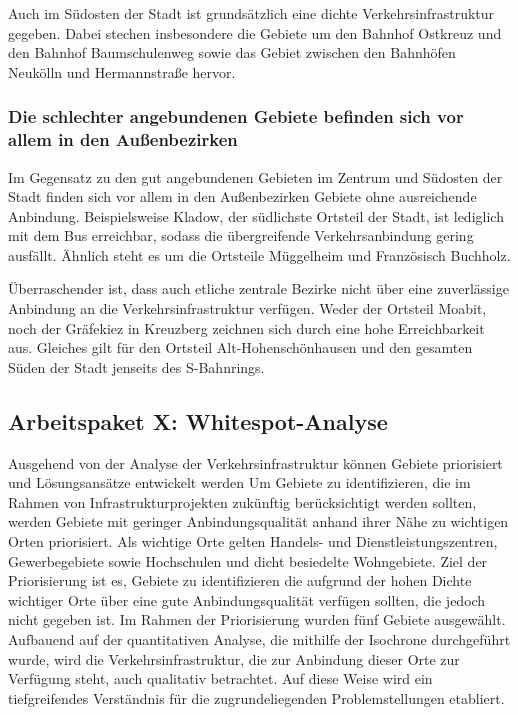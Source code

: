 Auch im Südosten der Stadt ist grundsätzlich eine dichte Verkehrsinfrastruktur gegeben. Dabei stechen insbesondere die Gebiete um den Bahnhof Ostkreuz und den Bahnhof Baumschulenweg sowie das Gebiet zwischen den Bahnhöfen Neukölln und Hermannstraße hervor.








\subsubsection{Die schlechter angebundenen Gebiete befinden sich vor allem in den Außenbezirken}
Im Gegensatz zu den gut angebundenen Gebieten im Zentrum und Südosten der Stadt finden sich vor allem in den Außenbezirken Gebiete ohne ausreichende Anbindung. Beispielsweise Kladow, der südlichste Ortsteil der Stadt, ist lediglich mit dem Bus erreichbar, sodass die übergreifende Verkehrsanbindung gering ausfällt. Ähnlich steht es um die Ortsteile Müggelheim und Französisch Buchholz.

Überraschender ist, dass auch etliche zentrale Bezirke nicht über eine zuverlässige Anbindung an die Verkehrsinfrastruktur verfügen. Weder der Ortsteil Moabit, noch der Gräfekiez in Kreuzberg zeichnen sich durch eine hohe Erreichbarkeit aus. Gleiches gilt für den Ortsteil Alt-Hohenschönhausen und den gesamten Süden der Stadt jenseits des S-Bahnrings.






\subsection{Arbeitspaket X: Whitespot-Analyse}



Ausgehend von der Analyse der Verkehrsinfrastruktur können Gebiete priorisiert und Lösungsansätze entwickelt werden
Um Gebiete zu identifizieren, die im Rahmen von Infrastrukturprojekten zukünftig berücksichtigt werden sollten, werden Gebiete mit geringer Anbindungsqualität anhand ihrer Nähe zu wichtigen Orten priorisiert. Als wichtige Orte gelten Handels- und Dienstleistungszentren, Gewerbegebiete sowie Hochschulen und dicht besiedelte Wohngebiete. Ziel der Priorisierung ist es, Gebiete zu identifizieren die aufgrund der hohen Dichte wichtiger Orte über eine gute Anbindungsqualität verfügen sollten, die jedoch nicht gegeben ist. Im Rahmen der Priorisierung wurden fünf Gebiete ausgewählt. Aufbauend auf der quantitativen Analyse, die mithilfe der Isochrone durchgeführt wurde, wird die Verkehrsinfrastruktur, die zur Anbindung dieser Orte zur Verfügung steht, auch qualitativ betrachtet. Auf diese Weise wird ein tiefgreifendes Verständnis für die zugrundeliegenden Problemstellungen etabliert.

